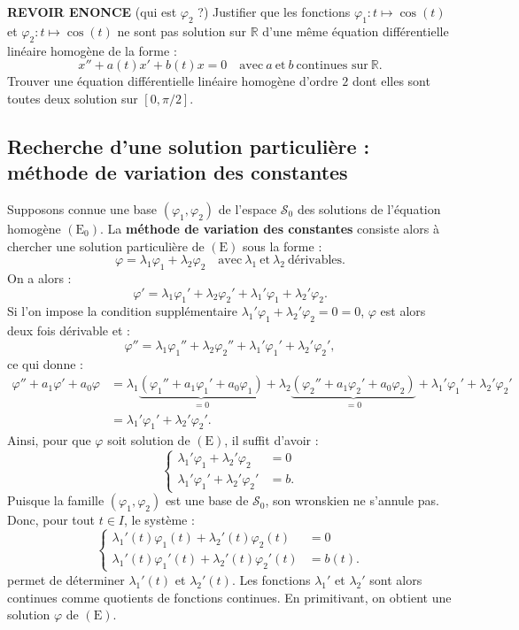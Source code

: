 \documentclass[french]{article}
\newcommand{\R}{\mathbb{R}}
\theoremstyle{plain}
\theoremstyle{definition}
\theoremstyle{remark}
\begin{document}
\begin{exo}\textbf{REVOIR ENONCE} (qui est $\varphi_2$ ?)
	Justifier que les fonctions $\varphi_1:t\mapsto\cos(t)$ et $\varphi_2:t\mapsto\cos(t)$ ne sont pas solution sur $\R$ d'une même équation différentielle linéaire homogène de la forme :
	$$x''+a(t)x'+b(t)x=0\quad \text{avec}\ a\ \text{et}\ b\ \text{continues sur}\ \R.$$
	Trouver une équation différentielle linéaire homogène d'ordre $2$ dont elles sont toutes deux solution sur $[0,\pi/2]$.
\end{exo}

\subsection{Recherche d'une solution particulière : méthode de variation des constantes}

Supposons connue une base $(\varphi_1,\varphi_2)$ de l'espace $\mathcal{S}_0$ des solutions de l'équation homogène $(\text{E}_0)$. La \textbf{méthode de variation des constantes} consiste alors à chercher une solution particulière de $(\text{E})$ sous la forme :
$$\varphi=\lambda_1\varphi_1+\lambda_2\varphi_2\quad\text{avec}\ \lambda_1\ \text{et}\ \lambda_2\ \text{dérivables}.$$
On a alors :
$$\varphi'=\lambda_1\varphi_1'+\lambda_2\varphi_2'+\lambda_1'\varphi_1+\lambda_2'\varphi_2.$$
Si l'on impose la condition supplémentaire $\lambda_1'\varphi_1+\lambda_2'\varphi_2=0=0$, $\varphi$ est alors deux fois dérivable et :
$$\varphi''=\lambda_1\varphi_1''+\lambda_2\varphi_2''+\lambda_1'\varphi_1'+\lambda_2'\varphi_2',$$ ce qui donne :
\begin{align*}
	\varphi''+a_1\varphi'+a_0\varphi&=\lambda_1\underbrace{(\varphi_1''+a_1\varphi_1'+a_0\varphi_1)}_{=0}+\lambda_2\underbrace{(\varphi_2''+a_1\varphi_2'+a_0\varphi_2)}_{=0}+\lambda_1'\varphi_1'+\lambda_2'\varphi_2'\\
	&=\lambda_1'\varphi_1'+\lambda_2'\varphi_2'.
\end{align*}
Ainsi, pour que $\varphi$ soit solution de $(\text{E})$, il suffit d'avoir :
$$\begin{cases}
	\lambda_1'\varphi_1+\lambda_2'\varphi_2&=0\\
	\lambda_1'\varphi_1'+\lambda_2'\varphi_2'&=b.
\end{cases}$$
Puisque la famille $(\varphi_1,\varphi_2)$ est une base de $\mathcal{S}_0$, son wronskien ne s'annule pas. Donc, pour tout $t\in I$, le système :
$$\begin{cases}
	\lambda_1'(t)\varphi_1(t)+\lambda_2'(t)\varphi_2(t)&=0\\
	\lambda_1'(t)\varphi_1'(t)+\lambda_2'(t)\varphi_2'(t)&=b(t).
\end{cases}$$
permet de déterminer $\lambda_1'(t)$ et $\lambda_2'(t)$. Les fonctions $\lambda_1'$ et $\lambda_2'$ sont alors continues comme quotients de fonctions continues. En primitivant, on obtient une solution $\varphi$ de $(\text{E})$.
\end{document}
